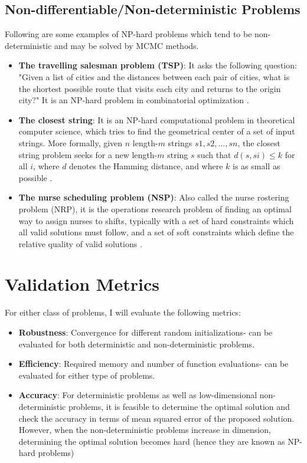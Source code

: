 \documentclass[conference]{IEEEtran}
\begin{document}
\subsection{Non-differentiable/Non-deterministic Problems}
Following are some examples of NP-hard problems which tend to be non-deterministic and may be solved by MCMC methods.

\begin{itemize}
	\item{\textbf{The travelling salesman problem (TSP)}: It asks the following question: "Given a list of cities and the distances between each pair of cities, what is the shortest possible route that visits each city and returns to the origin city?" It is an NP-hard problem in combinatorial optimization \cite{b2}.}
	
	\item{\textbf{The closest string}: It is an NP-hard computational problem in theoretical computer science, which tries to find the geometrical center of a set of input strings. More formally, given $n$ length-$m$ strings $s1, s2, ..., sn$, the closest string problem seeks for a new length-$m$ string $s$ such that $d(s,si) ≤ k$ for all $i$, where $d$ denotes the Hamming distance, and where $k$ is as small as possible \cite{b4}.}

	\item{\textbf{The nurse scheduling problem (NSP)}: Also called the nurse rostering problem (NRP), it is the operations research problem of finding an optimal way to assign nurses to shifts, typically with a set of hard constraints which all valid solutions must follow, and a set of soft constraints which define the relative quality of valid solutions \cite{b5}.}
\end{itemize}

\section{Validation Metrics}
For either class of problems, I will evaluate the following metrics:
\begin{itemize}
	\item{\textbf{Robustness}: Convergence for different random initializations- can be evaluated for both deterministic and non-deterministic problems.}

	\item{\textbf{Efficiency}: Required memory and number of function evaluations- can be evaluated for either type of problems.}

	\item{\textbf{Accuracy}: For deterministic problems as well as low-dimensional non-deterministic problems, it is feasible to determine the optimal solution and check the accuracy in terms of mean squared error of the proposed solution. However, when the non-deterministic problems increase in dimension, determining the optimal solution becomes hard (hence they are known as NP-hard problems)}
\end{itemize}
\end{document}
